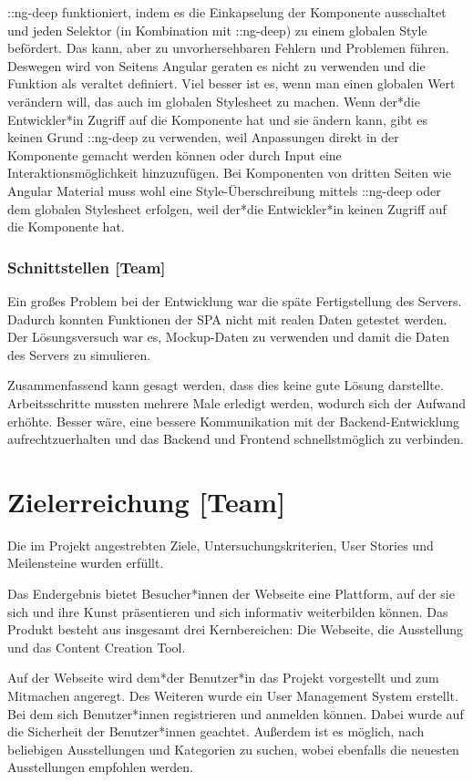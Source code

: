 ::ng-deep funktioniert, indem es die Einkapselung der Komponente ausschaltet und jeden Selektor (in Kombination mit ::ng-deep) zu einem globalen Style befördert. Das kann, aber zu unvorhersehbaren Fehlern und Problemen führen. Deswegen wird von Seitens Angular geraten es nicht zu verwenden und die Funktion als veraltet definiert. Viel besser ist es, wenn man einen globalen Wert verändern will, das auch im globalen Stylesheet zu machen.
Wenn der*die Entwickler*in Zugriff auf die Komponente hat und sie ändern kann, gibt es keinen Grund ::ng-deep zu verwenden, weil Anpassungen direkt in der Komponente gemacht werden können oder durch Input eine Interaktionsmöglichkeit hinzuzufügen. Bei Komponenten von dritten Seiten wie Angular Material muss wohl eine Style-Überschreibung mittels ::ng-deep oder dem globalen Stylesheet erfolgen, weil der*die Entwickler*in keinen Zugriff auf die Komponente hat. \cite{AngularComponentsStyleNgDEEP, UnderstandingNgDeep}

\subsubsection{Schnittstellen [Team]}
Ein großes Problem bei der Entwicklung war die späte Fertigstellung des Servers.
Dadurch konnten Funktionen der SPA nicht mit realen Daten getestet werden. Der Lösungsversuch war es, Mockup-Daten zu verwenden und damit die Daten des Servers zu simulieren.  

Zusammenfassend kann gesagt werden, dass dies keine gute Lösung darstellte. Arbeitsschritte mussten mehrere Male erledigt werden, wodurch sich der Aufwand erhöhte. Besser wäre, eine bessere Kommunikation mit der Backend-Entwicklung aufrechtzuerhalten und das Backend und Frontend schnellstmöglich zu verbinden. 

\section{Zielerreichung [Team]}
Die im Projekt angestrebten Ziele, Untersuchungskriterien, User Stories und Meilensteine wurden erfüllt.

Das Endergebnis bietet Besucher*innen der Webseite eine Plattform, auf der sie sich und ihre Kunst präsentieren und sich informativ weiterbilden können. Das Produkt besteht aus insgesamt drei Kernbereichen: Die Webseite, die Ausstellung und das Content Creation Tool.

Auf der Webseite wird dem*der Benutzer*in das Projekt vorgestellt und zum Mitmachen angeregt. Des Weiteren wurde ein User Management System erstellt. Bei dem sich Benutzer*innen registrieren und anmelden können. Dabei wurde auf die Sicherheit der Benutzer*innen geachtet. Außerdem ist es möglich, nach beliebigen Ausstellungen und Kategorien zu suchen, wobei ebenfalls die neuesten Ausstellungen empfohlen werden.

